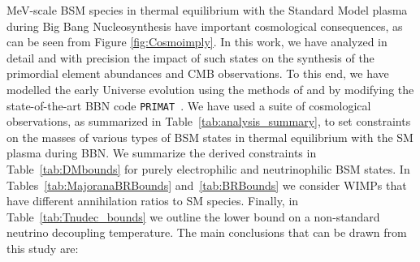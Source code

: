 \documentclass[notitlepage,letterpaper,natbib,aps,prd,onecolumn,amsmath,amsfonts,nofootinbib,preprintnumbers,superscriptaddress,secnumarabic,groupedaddress]{revtex4-1}
\begin{document}
MeV-scale BSM species in thermal equilibrium with the Standard Model plasma during Big Bang Nucleosynthesis have important cosmological consequences, as can be seen from Figure \ref{fig:Cosmoimply}. In this work, we have analyzed in detail and with precision the impact of such states on the synthesis of the primordial element abundances and CMB observations. To this end, we have modelled the early Universe evolution using the methods of \cite{Escudero:2018mvt,Escudero:2019new} and by modifying the state-of-the-art BBN code \texttt{PRIMAT}~\cite{Pitrou:2018cgg}. We have used a suite of cosmological observations, as summarized in Table~\ref{tab:analysis_summary}, to set constraints on the masses of various types of BSM states in thermal equilibrium with the SM plasma during BBN. We summarize the derived constraints in Table~\ref{tab:DMbounds} for purely electrophilic and neutrinophilic BSM states. In Tables~\ref{tab:MajoranaBRBounds} and~\ref{tab:BRBounds} we consider WIMPs that have different annihilation ratios to SM species. Finally, in Table~\ref{tab:Tnudec_bounds} we outline the lower bound on a non-standard neutrino decoupling temperature. The main conclusions that can be drawn from this study are:
 
\end{document}

